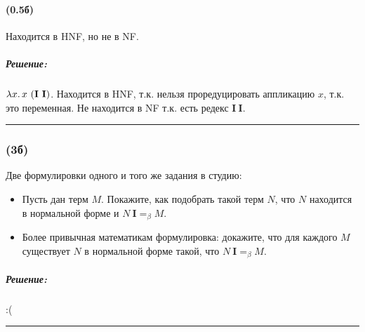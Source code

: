 \documentclass{article}
\newenvironment{proof}{\subparagraph{\hspace{-1em}Решение:\newline}\-}{\par\noindent\rule{\textwidth}{0.4pt}}
\newcommand{\comb}[1]{\mathbf{#1}}
\newcommand{\eqbeta}{=_\beta}
\begin{document}
    \paragraph{(0.5б)}

    Находится в HNF, но не в NF.

    \begin{proof}
        \(\lambda x\ldotp x~(\comb{I}~\comb{I})\). Находится в HNF, т.к. нельзя проредуцировать аппликацию \(x\), т.к. это переменная. Не находится в NF т.к. есть редекс \(\comb{I}~\comb{I}\).
    \end{proof}

    \subsubsection{(3б)}

    Две формулировки одного и того же задания в студию:
    \begin{itemize}
        \item Пусть дан терм $M$.
        Покажите, как подобрать такой терм $N$, что $N$ находится в нормальной форме и $N~\comb{I} =_\beta M$.
        \item Более привычная математикам формулировка: докажите, что для каждого $M$ существует $N$ в нормальной форме такой, что $N~\comb{I} \eqbeta M$.
    \end{itemize}
    \begin{proof}
        :(
    \end{proof}
\end{document}
